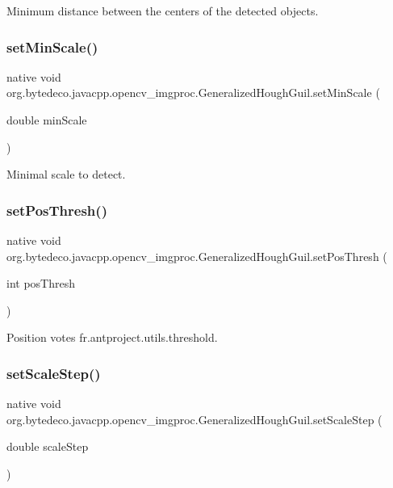 Minimum distance between the centers of the detected objects. \mbox{\label{group__imgproc_gac43dc1513a83e1b7e0744411e0df313b}} 
\subsubsection{\texorpdfstring{set\+Min\+Scale()}{setMinScale()}}
{\footnotesize\ttfamily native void org.\+bytedeco.\+javacpp.\+opencv\+\_\+imgproc.\+Generalized\+Hough\+Guil.\+set\+Min\+Scale (\begin{DoxyParamCaption}\item[{double}]{min\+Scale }\end{DoxyParamCaption})}

Minimal scale to detect. \mbox{\label{group__imgproc_ga5c699f44c50f521fee2c6103fe9686a4}} 
\subsubsection{\texorpdfstring{set\+Pos\+Thresh()}{setPosThresh()}}
{\footnotesize\ttfamily native void org.\+bytedeco.\+javacpp.\+opencv\+\_\+imgproc.\+Generalized\+Hough\+Guil.\+set\+Pos\+Thresh (\begin{DoxyParamCaption}\item[{int}]{pos\+Thresh }\end{DoxyParamCaption})}

Position votes fr.antproject.utils.threshold. \mbox{\label{group__imgproc_gae75f4f7f0497b548ae4b9443c241f1d8}}
\subsubsection{\texorpdfstring{set\+Scale\+Step()}{setScaleStep()}}
{\footnotesize\ttfamily native void org.\+bytedeco.\+javacpp.\+opencv\+\_\+imgproc.\+Generalized\+Hough\+Guil.\+set\+Scale\+Step (\begin{DoxyParamCaption}\item[{double}]{scale\+Step }\end{DoxyParamCaption})}

